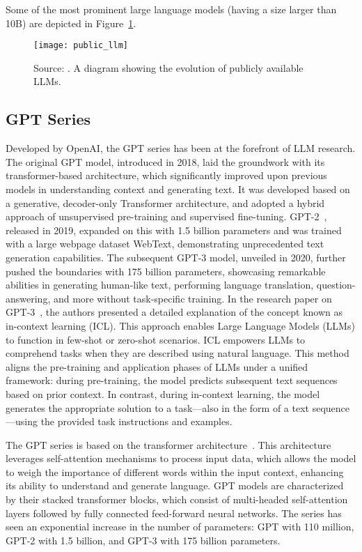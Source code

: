 Some of the most prominent large language models (having a size larger than 10B) are depicted in Figure~\ref{fig:llm-evolution}.

\begin{figure}
    \centering
    \texttt{[image: public\_llm]}
    \caption{Source: \protect\cite{survey}. A diagram showing the evolution of publicly available LLMs.}
    \label{fig:llm-evolution}
\end{figure}

\subsection{GPT Series}
\label{subsec:gpt-series}

Developed by OpenAI, the GPT series has been at the forefront of LLM research.
The original GPT model, introduced in 2018, laid the groundwork with its transformer-based architecture, which significantly improved upon previous models in understanding context and generating text.
It was developed based on a generative, decoder-only Transformer architecture, and adopted a hybrid approach of unsupervised pre-training and supervised fine-tuning.
GPT-2~\cite{gpt2}, released in 2019, expanded on this with 1.5 billion parameters and was trained with a large webpage dataset WebText, demonstrating unprecedented text generation capabilities.
The subsequent GPT-3 model, unveiled in 2020, further pushed the boundaries with 175 billion parameters, showcasing remarkable abilities in generating human-like text, performing language translation, question-answering, and more without task-specific training.
In the research paper on GPT-3~\cite{gpt3}, the authors presented a detailed explanation of the concept known as in-context learning (ICL). This approach enables Large Language Models (LLMs) to function in few-shot or zero-shot scenarios.
ICL empowers LLMs to comprehend tasks when they are described using natural language.
This method aligns the pre-training and application phases of LLMs under a unified framework: during pre-training, the model predicts subsequent text sequences based on prior context.
In contrast, during in-context learning, the model generates the appropriate solution to a task—also in the form of a text sequence—using the provided task instructions and examples.

The GPT series is based on the transformer architecture~\cite{vaswani2023attention}.
This architecture leverages self-attention mechanisms to process input data, which allows the model to weigh the importance of different words within the input context, enhancing its ability to understand and generate language.
GPT models are characterized by their stacked transformer blocks, which consist of multi-headed self-attention layers followed by fully connected feed-forward neural networks.
The series has seen an exponential increase in the number of parameters: GPT with 110 million, GPT-2 with 1.5 billion, and GPT-3 with 175 billion parameters.

